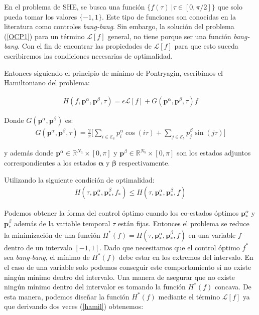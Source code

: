 En el problema de SHE, se busca una función $\{f(\tau) \ |  \tau \in [0,\pi/2] \}$  que solo pueda tomar los valores $\{-1,1\}$. Este tipo de funciones son conocidas en la literatura como controles \emph{bang-bang}. Sin embargo, la solución del problema (\ref{OCP1}) para un término $\mathcal{L}[f]$ general, no tiene porque ser una función \emph{bang-bang}. Con el fin de encontrar las propiedades de $\mathcal{L}[f]$ para que esto suceda escribiremos las condiciones necesarias de optimalidad. 

Entonces siguiendo el principio de mínimo de Pontryagin, escribimos el Hamiltoniano del problema:

\begin{gather}\label{hamil}
    H(f,\bm{p}^\alpha,\bm{p}^\beta,\tau) = \epsilon \mathcal{L}[f] + 
    G(\bm{p}^\alpha,\bm{p}^\beta,\tau) f
\end{gather}

Donde  $G(\bm{p}^\alpha,\bm{p}^\beta)$ es:
    \begin{gather}
        G(\bm{p}^\alpha,\bm{p}^\beta,\tau) = \frac{2}{\pi} \Bigg[ 
            \sum_{i \in \mathcal{E}_a} p^\alpha_i \cos(i\tau)+ 
            \sum_{j \in \mathcal{E}_b} p^\beta_j \sin(j\tau) 
        \Bigg]
    \end{gather}

y además donde $\bm{p}^\alpha \in \mathbb{R}^{N_a} \times [0,\pi]$ y $\bm{p}^\beta \in \mathbb{R}^{N_b}  \times [0,\pi]$ son los estados adjuntos correspondientes a los estados $\bm{\alpha}$ y $\bm{\beta}$ respectivamente. 
\newline 

Utilizando la siguiente condición de optimalidad:
\begin{gather}\label{minH}
    H(\tau,\bm{p}_*^\alpha,\bm{p}^\beta_*,f_*) \leq
    H(\tau,\bm{p}_*^\alpha,\bm{p}^\beta_*,f)
\end{gather}

Podemos obtener la forma del control óptimo cuando los co-estados óptimos $\bm{p}_*^\alpha$ y $\bm{p}_*^\beta$ además de la variable temporal $\tau$ están fijas. 
%
Entonces el problema se reduce la minimización de una función $H^*(f) = H(\tau,\bm{p}_*^\alpha,\bm{p}^\beta_*,f)$ en una variable $f$ dentro de un intervalo $[-1,1]$.
%
Dado que necesitamos que el control óptimo $f^*$ sea \emph{bang-bang}, el mínimo de $H^*(f)$ debe estar en los extremos del intervalo.
En el caso de una variable solo podemos conseguir este comportamiento si no existe ningún mínimo dentro del intervalo. Una manera de asegurar que no existe ningún mínimo dentro del intervalor es tomando la función $H^*(f)$ concava. De esta manera, podemos diseñar la función $H^*(f)$ mediante el término $\mathcal{L}[f]$ ya que derivando dos veces (\ref{hamil}) obtenemos:

